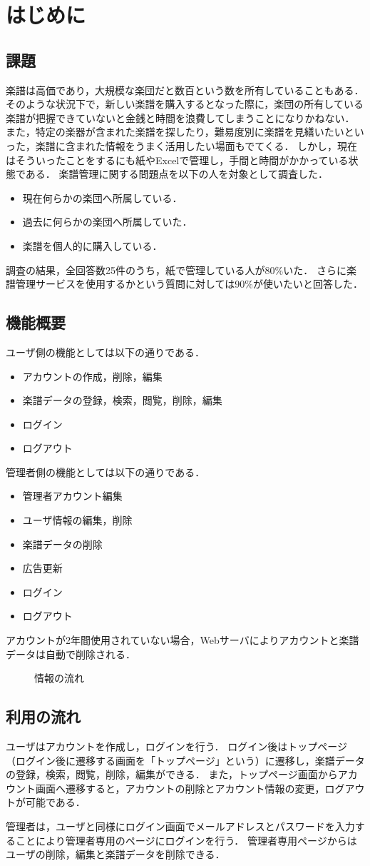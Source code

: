 \chapter{{はじめに}}
\section{課題}
楽譜は高価であり，大規模な楽団だと数百という数を所有していることもある．
そのような状況下で，新しい楽譜を購入するとなった際に，楽団の所有している楽譜が把握できていないと金銭と時間を浪費してしまうことになりかねない．
また，特定の楽器が含まれた楽譜を探したり，難易度別に楽譜を見繕いたいといった，楽譜に含まれた情報をうまく活用したい場面もでてくる．
しかし，現在はそういったことをするにも紙やExcelで管理し，手間と時間がかかっている状態である．
楽譜管理に関する問題点を以下の人を対象として調査した．
\begin{itemize}
    \item 現在何らかの楽団へ所属している．
    \item 過去に何らかの楽団へ所属していた．
    \item 楽譜を個人的に購入している．
\end{itemize}
調査の結果，全回答数25件のうち，紙で管理している人が80\%いた．
さらに楽譜管理サービスを使用するかという質問に対しては90\%が使いたいと回答した．
\section{機能概要}
ユーザ側の機能としては以下の通りである．
\begin{itemize}
    \item アカウントの作成，削除，編集
    \item 楽譜データの登録，検索，閲覧，削除，編集
    \item ログイン
    \item ログアウト
\end{itemize}
管理者側の機能としては以下の通りである．
\begin{itemize}
    \item 管理者アカウント編集
    \item ユーザ情報の編集，削除
    \item 楽譜データの削除
    \item 広告更新
    \item ログイン
    \item ログアウト
\end{itemize}
アカウントが2年間使用されていない場合，Webサーバによりアカウントと楽譜データは自動で削除される．
\begin{figure}[h]
    \centering
    
    \caption{情報の流れ}
\end{figure}
\section{利用の流れ}
ユーザはアカウントを作成し，ログインを行う．
ログイン後はトップページ（ログイン後に遷移する画面を「トップページ」という）に遷移し，楽譜データの登録，検索，閲覧，削除，編集ができる．
また，トップページ画面からアカウント画面へ遷移すると，アカウントの削除とアカウント情報の変更，ログアウトが可能である．\par
管理者は，ユーザと同様にログイン画面でメールアドレスとパスワードを入力することにより管理者専用のページにログインを行う．
管理者専用ページからはユーザの削除，編集と楽譜データを削除できる．